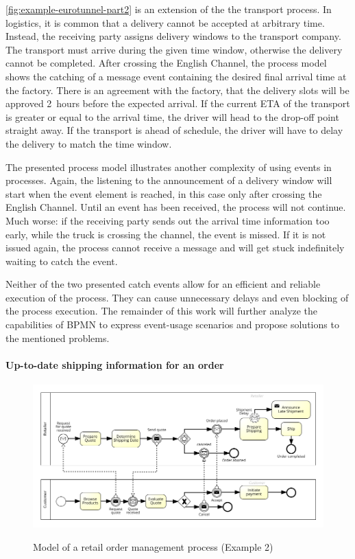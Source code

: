 \autoref{fig:example-eurotunnel-part2} is an extension of the the transport process.
In logistics, it is common that a delivery cannot be accepted at arbitrary time. Instead, the receiving party assigns delivery windows to the transport company.
The transport must arrive during the given time window, otherwise the delivery cannot be completed.
After crossing the English Channel, the process model shows the catching of a message event containing the desired final arrival time at the factory. There is an agreement with the factory, that the delivery slots will be approved 2~hours before the expected arrival.
If the current ETA of the transport is greater or equal to the arrival time, the driver will head to the drop-off point straight away. If the transport is ahead of schedule, the driver will have to delay the delivery to match the time window.

The presented process model illustrates another complexity of using events in processes. Again, the listening to the announcement of a delivery window will start when the event element is reached, in this case only after crossing the English Channel. 
Until an event has been received, the process will not continue. 
Much worse: if the receiving party sends out the arrival time information too early, while the truck is crossing the channel, the event is missed. If it is not issued again, the process cannot receive a message and will get stuck indefinitely waiting to catch the event.

Neither of the two presented catch events allow for an efficient and reliable execution of the process. They can cause unnecessary delays and even blocking of the process execution.
The remainder of this work will further analyze the capabilities of BPMN to express event-usage scenarios and propose solutions to the mentioned problems.


\paragraph{Up-to-date shipping information for an order}
\begin{figure}[]
	\myfloatalign
	{\includegraphics[width=1\linewidth]{chapters/requirements/Retail-Order.png}}
	\caption{Model of a retail order management process (Example 2)}
	\label{fig:example-order}
\end{figure}

